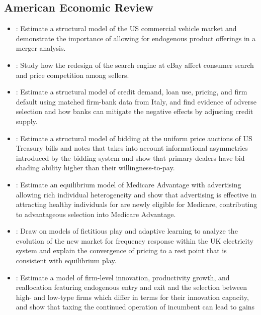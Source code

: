 \documentclass[]{book}
\begin{document}
\subsection{American Economic Review}\label{american-economic-review}

\begin{itemize}
\item
  \citet{wollmannTrucksBailoutsEquilibrium2018}: Estimate a structural
  model of the US commercial vehicle market and demonstrate the
  importance of allowing for endogenous product offerings in a merger
  analysis.
\item
  \citet{dinersteinConsumerPriceSearch2018}: Study how the redesign of
  the search engine at eBay affect consumer search and price competition
  among sellers.
\item
  \citet{crawfordAsymmetricInformationImperfect2018}: Estimate a
  structural model of credit demand, loan use, pricing, and firm default
  using matched firm-bank data from Italy, and find evidence of adverse
  selection and how banks can mitigate the negative effects by adjusting
  credit supply.
\item
  \citet{hortacsuBidShadingBidder2018}: Estimate a structural model of
  bidding at the uniform price auctions of US Treasury bills and notes
  that takes into account informational asymmetries introduced by the
  bidding system and show that primary dealers have bid-shading ability
  higher than their willingness-to-pay.
\item
  \citet{aizawaAdvertisingRiskSelection2018}: Estimate an equilibrium
  model of Medicare Advantage with advertising allowing rich individual
  heterogeneity and show that advertising is effective in attracting
  healthy individuals for are newly eligible for Medicare, contributing
  to advantageous selection into Medicare Advantage.
\item
  \citet{doraszelskiJustStartingOut2018}: Draw on models of fictitious
  play and adaptive learning to analyze the evolution of the new market
  for frequency response within the UK electricity system and explain
  the convergence of pricing to a rest point that is consistent with
  equilibrium play.
\item
  \citet{acemogluInnovationReallocationGrowth2018}: Estimate a model of
  firm-level innovation, productivity growth, and reallocation featuring
  endogenous entry and exit and the selection between high- and low-type
  firms which differ in terms for their innovation capacity, and show
  that taxing the continued operation of incumbent can lead to gains

\end{itemize}
\end{document}

